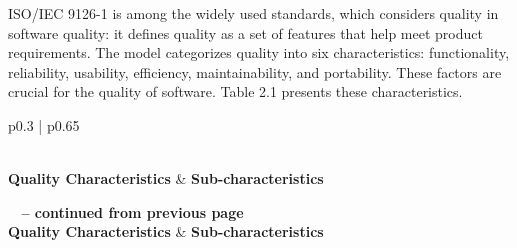 ISO/IEC 9126-1 is among the widely used standards, which considers quality in software quality: it defines quality as a set of features that help meet product requirements. The model categorizes quality into six characteristics: functionality, reliability, usability, efficiency, maintainability, and portability. These factors are crucial for the quality of software. Table 2.1 presents these characteristics.


\begin{longtable}{p{} | p{}}
    \caption{Sub-characteristics of the ISO 9126-1 quality model \cite{losavio2004iso}} \label{tab:table1} \\
    \textbf{Quality Characteristics} & \textbf{Sub-characteristics} \\
    \hline
    \endfirsthead

    {{\bfseries \tablename\ \thetable{} -- continued from previous page}} \\
    \textbf{Quality Characteristics} & \textbf{Sub-characteristics} \\
    \hline
    \endhead

    \hline {} \\
    \endfoot


\end{longtable}
